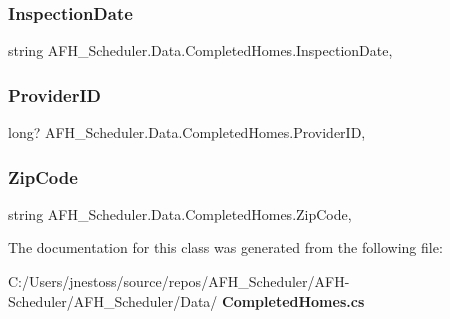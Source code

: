 \mbox{\label{class_a_f_h___scheduler_1_1_data_1_1_completed_homes_a7b7319bcaa19dddb1e202a62cf65598c}} 
\subsubsection{InspectionDate}
{\footnotesize\ttfamily string A\+F\+H\+\_\+\+Scheduler.\+Data.\+Completed\+Homes.\+Inspection\+Date\hspace{0.3cm}{\ttfamily [get]}, {\ttfamily [set]}}

\mbox{\label{class_a_f_h___scheduler_1_1_data_1_1_completed_homes_a3283200fd2d066562ecc60d0591f9c4d}} 
\subsubsection{ProviderID}
{\footnotesize\ttfamily long? A\+F\+H\+\_\+\+Scheduler.\+Data.\+Completed\+Homes.\+Provider\+ID\hspace{0.3cm}{\ttfamily [get]}, {\ttfamily [set]}}

\mbox{\label{class_a_f_h___scheduler_1_1_data_1_1_completed_homes_aaf994402bd6e875f7e94e6717a496a0b}} 
\subsubsection{ZipCode}
{\footnotesize\ttfamily string A\+F\+H\+\_\+\+Scheduler.\+Data.\+Completed\+Homes.\+Zip\+Code\hspace{0.3cm}{\ttfamily [get]}, {\ttfamily [set]}}



The documentation for this class was generated from the following file\+:\begin{DoxyCompactItemize}
\item 
C\+:/\+Users/jnestoss/source/repos/\+A\+F\+H\+\_\+\+Scheduler/\+A\+F\+H-\/\+Scheduler/\+A\+F\+H\+\_\+\+Scheduler/\+Data/\textbf{ Completed\+Homes.\+cs}\end{DoxyCompactItemize}
